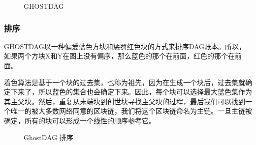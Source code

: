 \documentclass[a4paper,11pt]{article}
\begin{document}
\begin{figure}[ht]
	\centerline{%
	}
\caption{GHOSTDAG}
\end{figure}


\subsubsection{排序}

GHOSTDAG以一种偏爱蓝色方块和惩罚红色块的方式来排序DAG账本。所以，如果两个方块X和Y在图上没有偏序，那么蓝色的那个在前面，红色的那个在前面。

着色算法是基于一个块的过去集，也称为祖先，因为在生成一个块后，过去集就确定下来了，所以蓝色的集合也会确定下来。因此，每个块可以选择最大蓝色集作为其主父块。然后，重复从末端块到创世块寻找主父块的过程，最后我们可以找到一个唯一的被大多数网络同意的区块链，我们将这个区块链命名为主链。一旦主链被确定，所有的块可以形成一个线性的顺序参考它。

\begin{figure}[ht]
	\centerline{%
	}
\caption{GhostDAG 排序}
\end{figure}
\end{document}
